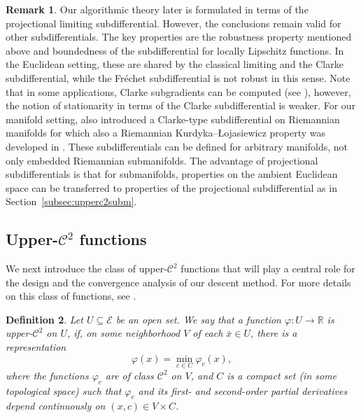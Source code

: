 \documentclass[a4paper, 12pt]{article}
\numberwithin{equation}{section}
\theoremstyle{bolddef}
\newtheorem{definition}{Definition}[section]
\theoremstyle{definition}
\newtheorem{remark}[definition]{Remark}
\theoremstyle{boldplain}
\newcommand{\X}{\mathcal{E}}
\begin{document}
\begin{remark}
Our algorithmic theory later is formulated in terms of the projectional limiting subdifferential. However, the conclusions remain valid for other subdifferentials. The key properties are the robustness property mentioned above and boundedness of the subdifferential for locally Lipschitz functions. In the Euclidean setting, these are shared by the classical limiting and the Clarke subdifferential, while the Fréchet subdifferential is not robust in this sense. Note that in some applications, Clarke subgradients can be computed (see \cite{aragon2025}), however, the notion of stationarity in terms of the Clarke subdifferential is weaker. For our manifold setting, \cite{Hosseini2018} also introduced a Clarke-type subdifferential on Riemannian manifolds for which also a Riemannian Kurdyka–Łojasiewicz property was developed in \cite{Huang2022}. These subdifferentials can be defined for arbitrary manifolds, not only embedded Riemannian submanifolds. The advantage of projectional subdifferentials is that for submanifolds, properties on the ambient Euclidean space can be transferred to properties of the projectional subdifferential as in Section~\ref{subsec:upperc2subm}.
\end{remark}

\subsection{Upper-$\mathcal{C}^2$ functions}

We next introduce the class of upper-$ \mathcal{C}^2 $ functions that will play
a central role for the design and the convergence analysis of our
descent method. For more details on this class of functions, see
\cite{RockafellarWets2009}.

\begin{definition}\label{def:upperC2}
Let $ U \subseteq \X$ be an open set. We say that a function
$ \varphi: U \to \mathbb{R} $ is {\normalfont upper-$ \mathcal{C}^2 $} on $ U $, if, 
on some neighborhood $ V $ of each $ \bar{x} \in U $, there is a 
representation 
\begin{equation*}
	\varphi (x) = \min_{c \in C} \varphi_c (x),
\end{equation*}
where the functions $ \varphi_c $ are of class $\mathcal{C}^2 $ on $ V $, and 
$ C $ is a compact set (in some topological space) such that 
$ \varphi_c $ and its first- and second-order partial derivatives
depend continuously on $ (x,c) \in V \times C $.
\end{definition}
\end{document}
